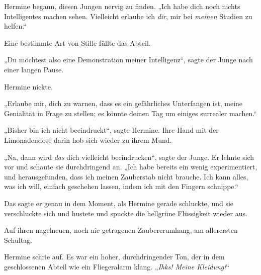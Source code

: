 Hermine begann, diesen Jungen nervig zu finden. „Ich habe dich noch nichts Intelligentes machen sehen. Vielleicht erlaube ich \emph{dir}, mir bei \emph{meinen} Studien zu helfen.“

Eine bestimmte Art von Stille füllte das Abteil.

„Du möchtest also eine Demonstration meiner Intelligenz“, sagte der Junge nach einer langen Pause.

Hermine nickte.

„Erlaube mir, dich zu warnen, dass es ein gefährliches Unterfangen ist, meine Genialität in Frage zu stellen; es könnte deinen Tag um einiges surrealer machen.“

„Bisher bin ich nicht beeindruckt“, sagte Hermine. Ihre Hand mit der Limonadendose darin hob sich wieder zu ihrem Mund.

„Na, dann wird \emph{das} dich vielleicht beeindrucken“, sagte der Junge. Er lehnte sich vor und schaute sie durchdringend an. „Ich habe bereits ein wenig experimentiert, und herausgefunden, dass ich meinen Zauberstab nicht brauche. Ich kann alles, was ich will, einfach geschehen lassen, indem ich mit den Fingern schnippe.“

Das sagte er genau in dem Moment, als Hermine gerade schluckte, und sie verschluckte sich und hustete und spuckte die hellgrüne Flüssigkeit wieder aus.

Auf ihren nagelneuen, noch nie getragenen Zaubererumhang, am allerersten Schultag.

Hermine schrie auf. Es war ein hoher, durchdringender Ton, der in dem geschlossenen Abteil wie ein Fliegeralarm klang. „\emph{Ihks! Meine Kleidung!}“

